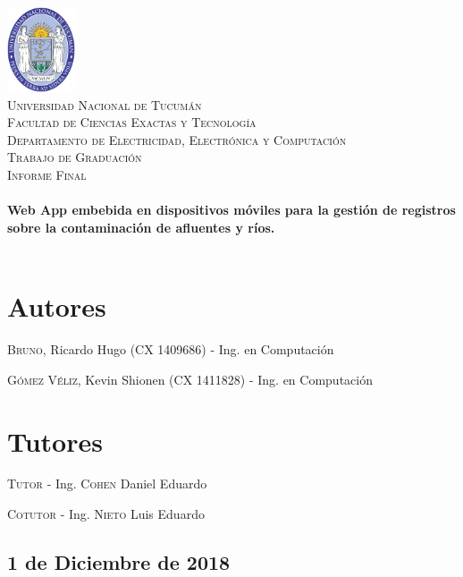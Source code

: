 \begin{titlepage}
 
\begin{center}
 
 
\includegraphics[width=0.15\textwidth]{imagenes/logo-unt.png}\\[0.5cm]
 
\textsc{\LARGE Universidad Nacional de Tucumán}\\[0.5cm]

\textsc{\normalsize Facultad de Ciencias Exactas y Tecnología}\\[0.5cm]

\textsc{\small Departamento de Electricidad, Electrónica y Computación}\\[0.7cm]
 
\textsc{\LARGE Trabajo de Graduación}\\[0.1cm]

\textsc{\normalsize Informe Final}\\[0.1cm]
 
 
\HRule \\[0.4cm]
{ \LARGE \bfseries Web App embebida en dispositivos móviles para la gestión de registros sobre la contaminación de afluentes y ríos.
}\\[0.4cm]
\HRule \\[0.4cm]
 
\end{center} 

\section*{Autores}
\textsc{Bruno}, Ricardo Hugo (CX 1409686) - Ing. en Computación

\textsc{Gómez Véliz}, Kevin Shionen (CX 1411828) - Ing. en Computación

\section*{Tutores}
\textsc{Tutor - } Ing. \textsc{Cohen} Daniel Eduardo

\textsc{Cotutor - } Ing. \textsc{Nieto} Luis Eduardo

\begin{center}
\subsection*{1 de Diciembre de 2018}
\end{center}

\end{titlepage}